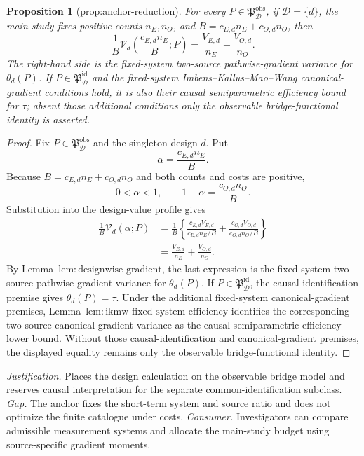 \documentclass{article}
\newtheorem{proposition}{Proposition}
\begin{document}
\begin{proposition}[prop:anchor-reduction]\label{prop:anchor-reduction}
For every \(P\in\mathfrak P_{\mathcal D}^{\mathrm{obs}}\), if \(\mathcal D=\{d\}\), the main study fixes positive counts \(n_E,n_O\), and \(B=c_{E,d}n_E+c_{O,d}n_O\), then
\[
 \frac1B\mathcal V_d\!\left(\frac{c_{E,d}n_E}{B};P\right)
 =\frac{V_{E,d}}{n_E}+\frac{V_{O,d}}{n_O}.
\]
The right-hand side is the fixed-system two-source pathwise-gradient variance for \(\theta_d(P)\). If \(P\in\mathfrak P_{\mathcal D}^{\mathrm{id}}\) and the fixed-system Imbens--Kallus--Mao--Wang canonical-gradient conditions hold, it is also their causal semiparametric efficiency bound for \(\tau\); absent those additional conditions only the observable bridge-functional identity is asserted.
\end{proposition}
\begin{proof}
Fix \(P\in\mathfrak P_{\mathcal D}^{\mathrm{obs}}\) and the singleton design \(d\).  Put
\[
 \alpha=\frac{c_{E,d}n_E}{B}.
\]
Because \(B=c_{E,d}n_E+c_{O,d}n_O\) and both counts and costs are positive,
\[
 0<\alpha<1,
 \qquad
 1-\alpha=\frac{c_{O,d}n_O}{B}.
\]
Substitution into the design-value profile gives
\[
\begin{aligned}
 \frac1B\mathcal V_d(\alpha;P)
 &=\frac1B\left\{
 \frac{c_{E,d}V_{E,d}}{c_{E,d}n_E/B}
 +\frac{c_{O,d}V_{O,d}}{c_{O,d}n_O/B}\right\}\\
 &=\frac{V_{E,d}}{n_E}+\frac{V_{O,d}}{n_O}.
\end{aligned}
\]
By Lemma~\(\mathrm{lem{:}designwise\text{-}gradient}\), the last expression is the fixed-system two-source pathwise-gradient variance for \(\theta_d(P)\).  If \(P\in\mathfrak P_{\mathcal D}^{\mathrm{id}}\), the causal-identification premise gives \(\theta_d(P)=\tau\).  Under the additional fixed-system canonical-gradient premises, Lemma~\(\mathrm{lem{:}ikmw\text{-}fixed\text{-}system\text{-}efficiency}\) identifies the corresponding two-source canonical-gradient variance as the causal semiparametric efficiency lower bound.  Without those causal-identification and canonical-gradient premises, the displayed equality remains only the observable bridge-functional identity.
\end{proof}
\par\smallskip\noindent \textit{Justification.} Places the design calculation on the observable bridge model and reserves causal interpretation for the separate common-identification subclass. \textit{Gap.} The anchor fixes the short-term system and source ratio and does not optimize the finite catalogue under costs. \textit{Consumer.} Investigators can compare admissible measurement systems and allocate the main-study budget using source-specific gradient moments.
\end{document}
